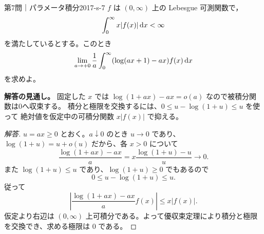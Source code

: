 \begin{problem}{第7問｜パラメータ積分}{2017-s-7}
$f$ は $(0,\infty)$ 上の Lebesgue 可測関数で，
\[
\int_0^\infty x|f(x)|\,\mathrm{d} x<\infty
\]
を満たしているとする。このとき
\[
\lim_{a\to+0}\frac1a\int_0^\infty(\log(ax+1)-ax)f(x)\,\mathrm{d} x
\]
を求めよ。
\end{problem}
\begin{memo*}
\textbf{解答の見通し。}
固定した $x$ では $\log(1+ax)-ax=o(a)$ なので被積分関数は0へ収束する。
積分と極限を交換するには、$0\le u-\log(1+u)\le u$ を使って
絶対値を仮定中の可積分関数 $x|f(x)|$ で抑える。
\end{memo*}
\begin{proof}[解答]
$u=ax\ge0$ とおく。$a\downarrow0$ のとき $u\to0$ であり、
$\log(1+u)=u+o(u)$ だから、各 $x>0$ について
\[
\frac{\log(1+ax)-ax}{a}
=x\frac{\log(1+u)-u}{u}\longrightarrow0.
\]
また $\log(1+u)\le u$ であり、$\log(1+u)\ge0$ でもあるので
\[
0\le u-\log(1+u)\le u.
\]
従って
\[
\left|\frac{\log(1+ax)-ax}{a}f(x)\right|
\le x|f(x)|.
\]
仮定より右辺は $(0,\infty)$ 上可積分である。よって優収束定理により積分と極限を交換でき、求める極限は $0$ である。
\end{proof}

